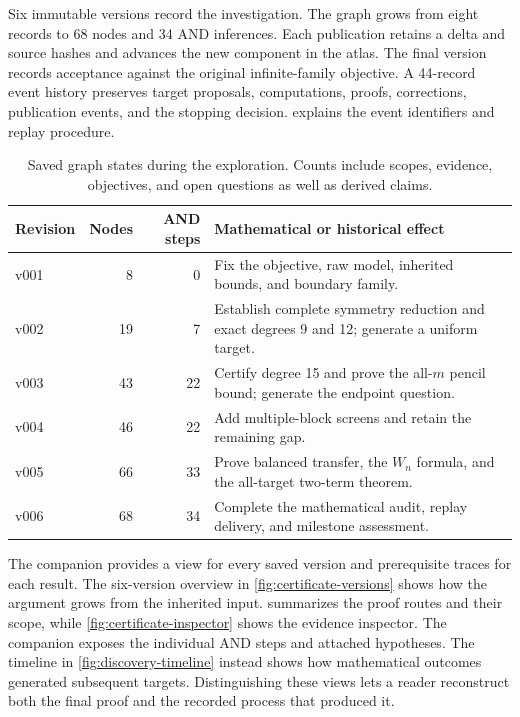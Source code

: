 Six immutable versions record the investigation. The graph grows from eight records to 68 nodes and 34 AND inferences. Each publication retains a delta and source hashes and advances the new component in the atlas. The final version records acceptance against the original infinite-family objective. A 44-record event history preserves target proposals, computations, proofs, corrections, publication events, and the stopping decision.  explains the event identifiers and replay procedure.

\begin{table}[htbp]
\centering\small
\begin{tabularx}{\linewidth}{@{}p{1.4cm}r r Y@{}}
\toprule
Revision & Nodes & AND steps & Mathematical or historical effect \\
\midrule
v001 & 8 & 0 & Fix the objective, raw model, inherited bounds, and boundary family. \\
v002 & 19 & 7 & Establish complete symmetry reduction and exact degrees 9 and 12; generate a uniform target. \\
v003 & 43 & 22 & Certify degree 15 and prove the all-$m$ pencil bound; generate the endpoint question. \\
v004 & 46 & 22 & Add multiple-block screens and retain the remaining gap. \\
v005 & 66 & 33 & Prove balanced transfer, the $W_n$ formula, and the all-target two-term theorem. \\
v006 & 68 & 34 & Complete the mathematical audit, replay delivery, and milestone assessment. \\
\bottomrule
\end{tabularx}
\caption{Saved graph states during the exploration. Counts include scopes, evidence, objectives, and open questions as well as derived claims.}
\label{tab:versions}
\end{table}





The companion provides a view for every saved version and prerequisite traces for each result. The six-version overview in \cref{fig:certificate-versions} shows how the argument grows from the inherited input.  summarizes the proof routes and their scope, while \cref{fig:certificate-inspector} shows the evidence inspector. The companion exposes the individual AND steps and attached hypotheses. The timeline in \cref{fig:discovery-timeline} instead shows how mathematical outcomes generated subsequent targets. Distinguishing these views lets a reader reconstruct both the final proof and the recorded process that produced it.

